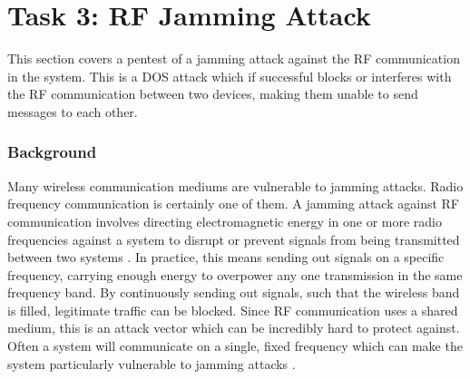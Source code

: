 \section{Task 3: RF Jamming Attack} \label{ch:pentesting:rf-jamming}
This section covers a pentest of a jamming attack against the RF communication in the system. This is a \gls{DOS} attack which if successful blocks or interferes with the RF communication between two devices, making them unable to send messages to each other.

\subsubsection{Background}
Many wireless communication mediums are vulnerable to jamming attacks. Radio frequency communication is certainly one of them. A jamming attack against RF communication involves directing electromagnetic energy in one or more radio frequencies against a system to disrupt or prevent signals from being transmitted between two systems \cite{adamy2004ew}. In practice, this means sending out signals on a specific frequency, carrying enough energy to overpower any one transmission in the same frequency band. By continuously sending out signals, such that the wireless band is filled, legitimate traffic can be blocked. Since RF communication uses a shared medium, this is an attack vector which can be incredibly hard to protect against. Often a system will communicate on a single, fixed frequency which can make the system particularly vulnerable to jamming attacks \cite{jamming-feasibility}.

